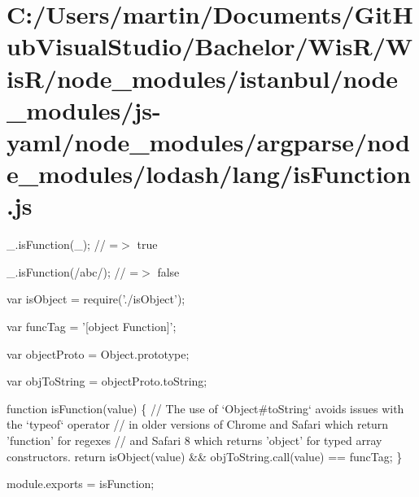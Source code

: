 \hypertarget{_c_1_2_users_2martin_2_documents_2_git_hub_visual_studio_2_bachelor_2_wis_r_2_wis_r_2node_module32d45eb27223e9fc5063647e6f1f4c77}{}\section{C\+:/\+Users/martin/\+Documents/\+Git\+Hub\+Visual\+Studio/\+Bachelor/\+Wis\+R/\+Wis\+R/node\+\_\+modules/istanbul/node\+\_\+modules/js-\/yaml/node\+\_\+modules/argparse/node\+\_\+modules/lodash/lang/is\+Function.\+js}
\+\_\+.\+is\+Function(\+\_\+); // =$>$ true

\+\_\+.\+is\+Function(/abc/); // =$>$ false


\begin{DoxyCodeInclude}
var isObject = require(\textcolor{stringliteral}{'./isObject'});

var funcTag = \textcolor{stringliteral}{'[object Function]'};

var objectProto = Object.prototype;

var objToString = objectProto.toString;

\textcolor{keyword}{function} isFunction(value) \{
  \textcolor{comment}{// The use of `Object#toString` avoids issues with the `typeof` operator}
  \textcolor{comment}{// in older versions of Chrome and Safari which return 'function' for regexes}
  \textcolor{comment}{// and Safari 8 which returns 'object' for typed array constructors.}
  \textcolor{keywordflow}{return} isObject(value) && objToString.call(value) == funcTag;
\}

module.exports = isFunction;
\end{DoxyCodeInclude}
 